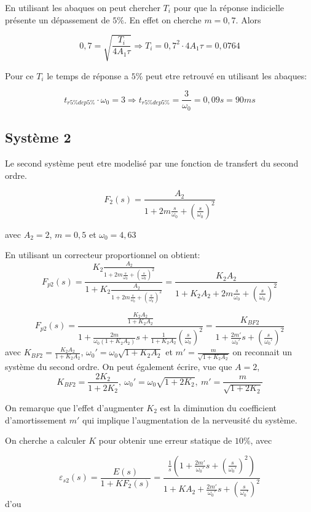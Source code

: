 \documentclass[12pt, a4paper]{report}
\begin{document}
En utilisant les abaques on peut chercher $T_i$ pour que la réponse indicielle
présente un dépassement de $5\%$. En effet on cherche $m = 0,7$. Alors

\[
    0,7 = \sqrt{\frac{T_i}{4 A_1 \tau}} \Rightarrow T_i = 0,7^2 \cdot 4 A_1 \tau = 0,0764  
\]

Pour ce $T_i$ le temps de réponse a $5\%$ peut etre retrouvé en utilisant les abaques:

\[
    t_{r5\%dep5\%} \cdot \omega_0 = 3 \Rightarrow t_{r5\%dep5\%} = \frac{3}{\omega_0} = 0,09s = 90ms
\]

\subsection{Système 2}

Le second système peut etre modelisé par une fonction de transfert du second ordre.

\[
    F_2(s) = \frac{A_2}{1 + 2 m \frac{s}{\omega_0} + \left( \frac{s}{\omega_0}\right)^2}
\]

avec $A_2 = 2$, $m = 0,5$ et $\omega_0 = 4,63$

En utilisant un correcteur proportionnel on obtient:
\[
    F_{p2}(s) = \frac{K_2 \frac{A_2}{1 + 2 m \frac{s}{\omega_0} + \left( \frac{s}{\omega_0}\right)^2}}{1 + K_2 \frac{A_2}{1 + 2 m \frac{s}{\omega_0} + \left( \frac{s}{\omega_0}\right)^2 }} = \frac{K_2 A_2}{1 + K_2A_2 + 2m \frac{s}{\omega_0} + \left( \frac{s}{\omega_0}\right)^2} 
\]

\[
    F_{p2}(s)  = \frac{\frac{K_2A_2}{1 + K_2A_2}}{1 + \frac{2m}{\omega_0(1 + K_2A_2)}s + \frac{1}{1 + K_2A_2} \left( \frac{s}{\omega_0}\right)^2} = \frac{K_{BF2}}{1 + \frac{2m'}{\omega_0'}s + \left( \frac{s}{\omega_0'}\right)^2}
\]
avec $K_{BF2} = \frac{K_2A_2}{1 + K_2A_2}$, $\omega_0' = \omega_0 \sqrt{1 + K_2A_2}$ et $m' = \frac{m}{\sqrt{1 + K_2A_2}}$ on reconnait un système du second ordre. On peut également écrire, vue que $A = 2$,
\[
    K_{BF2} = \frac{2K_2}{1 + 2K_2}, \ \omega_0' = \omega_0 \sqrt{1 + 2K_2},\ m' = \frac{m}{\sqrt{1 + 2K_2}}
\]

On remarque que l'effet d'augmenter $K_2$ est la diminution du coefficient d'amortissement $m'$ qui implique
l'augmentation de la nerveusité du système.  

On cherche a calculer $K$ pour obtenir une erreur statique de $10\%$, avec

\[
    \varepsilon_{s2} (s) = \frac{E(s)}{1 + KF_{2}(s)} = \frac{\frac{1}{s}\left(1 + \frac{2m'}{\omega_0'}s + \left( \frac{s}{\omega_0'}\right)^2\right)}{1 + KA_2 + \frac{2m'}{\omega_0'}s + \left( \frac{s}{\omega_0'}\right)^2}
\]
d'ou
\end{document}
